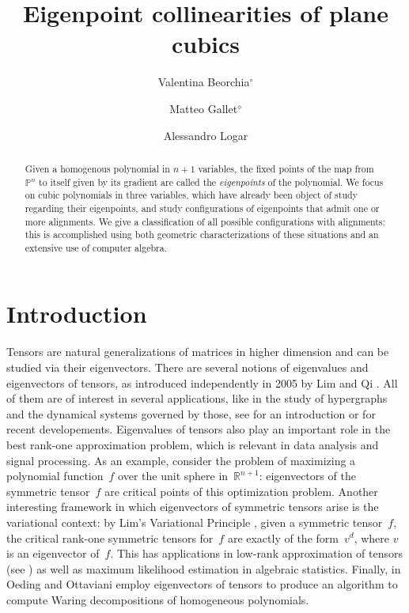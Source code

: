\documentclass{amsart}
\title{Eigenpoint collinearities of plane cubics}
\author[Valentina Beorchia]{Valentina Beorchia$^{\circ}$}
\author[Matteo Gallet]{Matteo Gallet$^{\diamond}$}
\author[Alessandro Logar]{Alessandro Logar}
\date{}
\theoremstyle{plain}
\theoremstyle{definition}
\newcommand{\R}{\mathbb{R}}
\newcommand{\p}{\mathbb{P}}
\begin{document}
\begin{abstract}
 Given a homogenous polynomial in $n+1$ variables, the fixed points of the map from $\p^n$ to itself given by its gradient are called the \emph{eigenpoints} of the polynomial. We focus on cubic polynomials in three variables, which have already been object of study regarding their eigenpoints, and study configurations of eigenpoints that admit one or more alignments. We give a classification of all possible configurations with alignments: this is accomplished using both geometric characterizations of these situations and an extensive use of computer algebra.
\end{abstract}

\maketitle

\section{Introduction}
\label{introduction}

Tensors are natural generalizations of matrices in higher dimension and can be studied via their eigenvectors. There are several notions of eigenvalues and eigenvectors of tensors, as introduced independently in 2005 by Lim \cite{Lim} and Qi \cite{Qi}. All of them are of interest in several applications, like in the study of hypergraphs and the dynamical systems governed by those, see \cite[Section 4]{QZ} for an introduction or \cite{GMV} for recent developements. Eigenvalues of tensors also play an important role in the best rank-one approximation problem, which is relevant in data analysis and signal processing.
As an example, consider the problem of maximizing a polynomial function~$f$ over the unit sphere in~$\R^{n+1}$: eigenvectors of the symmetric tensor~$f$ are critical points of this optimization problem. Another interesting framework in which eigenvectors of symmetric tensors arise is the variational context: by Lim's Variational Principle \cite{Lim}, given a symmetric tensor~$f$, the critical rank-one symmetric tensors for~$f$ are exactly of the form~$v^d$, where $v$ is an eigenvector of~$f$.
This has applications in low-rank approximation of tensors (see \cite{OttSod}) as well as maximum likelihood estimation in algebraic statistics. Finally, in \cite{OO} Oeding and Ottaviani employ eigenvectors of tensors to produce an algorithm to compute Waring decompositions of homogeneous polynomials.
\end{document}

